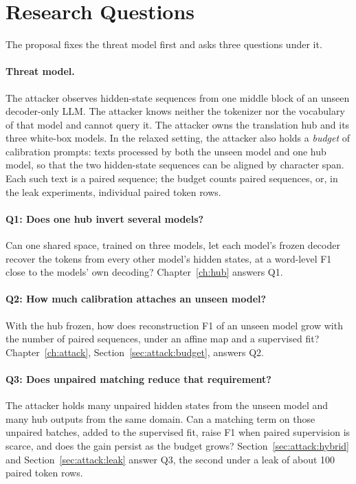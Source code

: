 \section{Research Questions}\label{sec:intro:questions}

The proposal fixes the threat model first and asks three questions under it.

\paragraph{Threat model.} The attacker observes hidden-state sequences from one middle block of an unseen decoder-only LLM. The attacker knows neither the tokenizer nor the vocabulary of that model and cannot query it. The attacker owns the translation hub and its three white-box models. In the relaxed setting, the attacker also holds a \emph{budget} of calibration prompts: texts processed by both the unseen model and one hub model, so that the two hidden-state sequences can be aligned by character span. Each such text is a paired sequence; the budget counts paired sequences, or, in the leak experiments, individual paired token rows.

\paragraph{Q1: Does one hub invert several models?} Can one shared space, trained on three models, let each model's frozen decoder recover the tokens from every other model's hidden states, at a word-level F1 close to the models' own decoding? Chapter~\ref{ch:hub} answers Q1.

\paragraph{Q2: How much calibration attaches an unseen model?} With the hub frozen, how does reconstruction F1 of an unseen model grow with the number of paired sequences, under an affine map and a supervised fit? Chapter~\ref{ch:attack}, Section~\ref{sec:attack:budget}, answers Q2.

\paragraph{Q3: Does unpaired matching reduce that requirement?} The attacker holds many unpaired hidden states from the unseen model and many hub outputs from the same domain. Can a matching term on those unpaired batches, added to the supervised fit, raise F1 when paired supervision is scarce, and does the gain persist as the budget grows? Section~\ref{sec:attack:hybrid} and Section~\ref{sec:attack:leak} answer Q3, the second under a leak of about 100 paired token rows.
